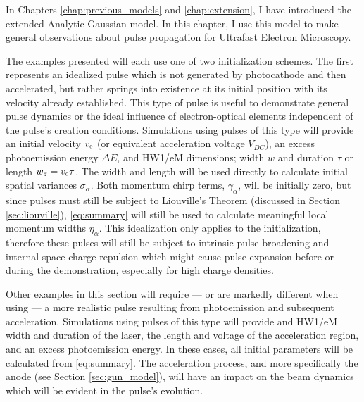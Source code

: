 
In Chapters \ref{chap:previous_models} and \ref{chap:extension}, I have introduced the extended Analytic Gaussian model.
In this chapter, I use this model to make general observations about pulse propagation for Ultrafast Electron Microscopy.

The examples presented will each use one of two initialization schemes.
The first represents an idealized pulse which is not generated by photocathode and then accelerated, but rather springs into existence at its initial position with its velocity already established.
This type of pulse is useful to demonstrate general pulse dynamics or the ideal influence of electron-optical elements independent of the pulse's creation conditions.
Simulations using pulses of this type will provide an initial velocity $v_{{\scriptscriptstyle 0}}$ (or equivalent acceleration voltage $V_{DC}$), an excess photoemission energy $\Delta E$, and HW1/eM dimensions; width $w$ and duration $\tau$ or length $ w_z = v_{{\scriptscriptstyle 0}} \tau$.
The width and length will be used directly to calculate initial spatial variances $\sigma_{\alpha}$.
Both momentum chirp terms, $\gamma_{\alpha}$, will be initially zero, but since pulses must still be subject to Liouville's Theorem (discussed in Section \ref{sec:liouville}), \ref{eq:summary} will still be used to calculate meaningful local momentum widths $\eta_{\alpha}$.
This idealization only applies to the initialization, therefore these pulses will still be subject to intrinsic pulse broadening and internal space-charge repulsion which might cause pulse expansion before or during the demonstration, especially for high charge densities.

Other examples in this section will require --- or are markedly different when using --- a more realistic pulse resulting from photoemission and subsequent acceleration.
Simulations using pulses of this type will provide and HW1/eM width and duration of the laser, the length and voltage of the acceleration region, and an excess photoemission energy.
In these cases, all initial parameters will be calculated from \ref{eq:summary}.
The acceleration process, and more specifically the anode (see Section \ref{sec:gun_model}), will have an impact on the beam dynamics which will be evident in the pulse's evolution.

